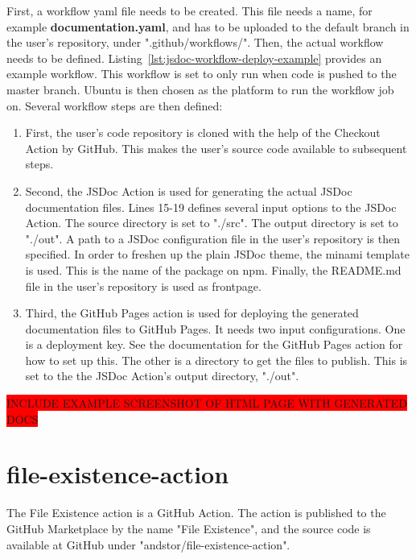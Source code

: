 First, a workflow yaml file needs to be created. This file needs a name, for example \textbf{documentation.yaml}, and has to be uploaded to the default branch in the user's repository, under ".github/workflows/". Then, the actual workflow needs to be defined. Listing~\ref{lst:jsdoc-workflow-deploy-example} provides an example workflow. This workflow is set to only run when code is pushed to the master branch. Ubuntu is then chosen as the platform to run the workflow job on. Several workflow steps are then defined:
\begin{enumerate}
    \item First, the user's code repository is cloned with the help of the Checkout Action by GitHub. This makes the user's source code available to subsequent steps. 
    \item Second, the JSDoc Action is used for generating the actual JSDoc documentation files. Lines 15-19 defines several input options to the JSDoc Action. The source directory is set to "./src". The output directory is set to "./out". A path to a JSDoc configuration file in the user's repository is then specified. In order to freshen up the plain JSDoc theme, the minami template is used. This is the name of the package on npm. Finally, the README.md file in the user's repository is used as frontpage. 
    \item Third, the GitHub Pages action is used for deploying the generated documentation files to GitHub Pages. It needs two input configurations. One is a deployment key. See the documentation for the GitHub Pages action for how to set up this. The other is a directory to get the files to publish. This is set to the the JSDoc Action's output directory, "./out".
\end{enumerate}

\colorbox{red}{INCLUDE EXAMPLE SCREENSHOT OF HTML PAGE WITH GENERATED DOCS}




\section{file-existence-action}
The File Existence action is a GitHub Action. The action is published to the GitHub Marketplace by the name "File Existence", and the source code is available at GitHub under "andstor/file-existence-action".

